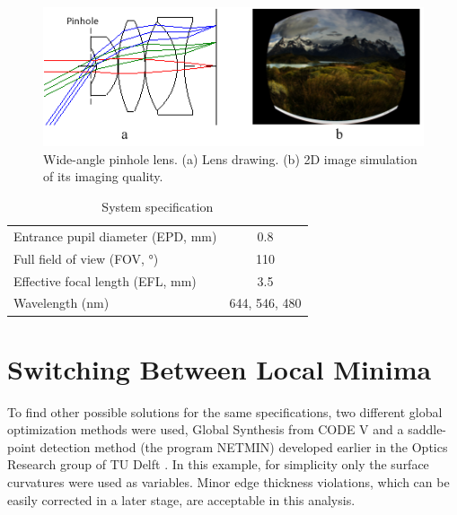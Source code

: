 \begin{figure}[h!]
    \centering
    \includegraphics[scale=0.95]{chapter-3/figures/WidePinLens.png}
    \caption{Wide-angle pinhole lens. (a) Lens drawing. (b) 2D image simulation of its imaging quality.}
    \label{fig:widepinLens}
\end{figure}

\setlength{\arrayrulewidth}{.5mm}
\setlength{\tabcolsep}{18pt}
\renewcommand{\arraystretch}{1.2}
\begin{table}[h!]
    \centering
    \captionsetup{justification=centering}
    \caption{System specification}
    \label{table: sysspec}
    \vspace{-1em}
    \begin{tabular}{ p{20em} c }
    \hline 
    Entrance pupil diameter (EPD, mm) & 0.8\\
    Full field of view (FOV, °) & 110\\
    Effective focal length (EFL, mm) & 3.5\\
    Wavelength (nm) & 644, 546, 480\\
    \hline
    \end{tabular}
\end{table}



\section{Switching Between Local Minima}

To find other possible solutions for the same specifications, two different global optimization methods were used, Global Synthesis from CODE V \cite{KuperGO1992}\cite{RogersGO2006} and a saddle-point detection method (the program NETMIN) developed earlier in the Optics Research group of TU Delft \cite{MarinescuSPD07}. In this example, for simplicity only the surface curvatures were used as variables. Minor edge thickness violations, which can be easily corrected in a later stage, are acceptable in this analysis. 

